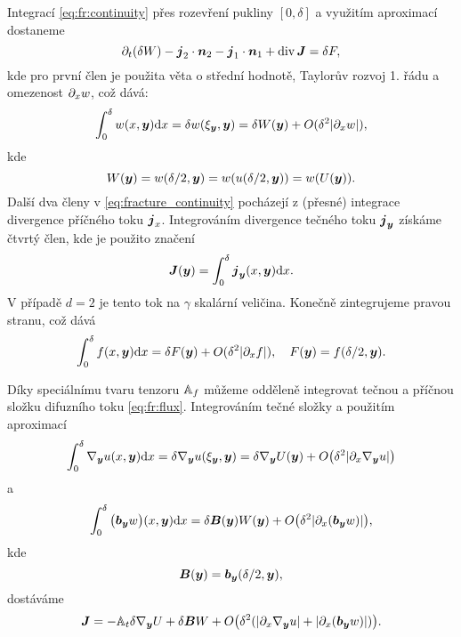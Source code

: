 Integrací \eqref{eq:fr:continuity} přes rozevření pukliny $[0,\delta]$ a využitím aproximací dostaneme
\begin{equation}
    \label{eq:fracture_continuity}
   \prtl_t (\delta W) - \vc j_2 \cdot \vc n_2 - \vc j_1 \cdot \vc n_1 + \div \vc J = \delta F,
\end{equation}
kde pro první člen je použita věta o střední hodnotě, Taylorův rozvoj 1. řádu 
a omezenost $\partial_x w$, což dává:
\[
    \int_0^\delta w(x,\mathbf{\boldsymbol{y}}) \mathrm{d} x=\delta w(\xi_{\mathbf{\boldsymbol{y}}}, \mathbf{\boldsymbol{y}}) = \delta W(\mathbf{\boldsymbol{y}}) + O(\delta^2\lvert\partial_x w\rvert),
\]
kde
\[
    W(\mathbf{\boldsymbol{y}})=w(\delta / 2,\mathbf{\boldsymbol{y}})=w(u(\delta/2,\mathbf{\boldsymbol{y}}))=w(U(\mathbf{\boldsymbol{y}})).
\]
Další dva členy v \eqref{eq:fracture_continuity} pocházejí z (přesné) integrace divergence příčného toku $\mathbf{\boldsymbol{j}}_x$.
Integrováním divergence tečného toku $\mathbf{\boldsymbol{j}}_{\mathbf{\boldsymbol{y}}}$ získáme čtvrtý člen, kde je použito značení
\[
\mathbf{\boldsymbol{J}}(\mathbf{\boldsymbol{y}}) = \int_0^\delta \mathbf{\boldsymbol{j}}_{\mathbf{\boldsymbol{y}}}(x, \mathbf{\boldsymbol{y}}) \mathrm{d} x.
\]
V případě $d=2$ je tento tok na $\gamma$ skalární veličina. Konečně zintegrujeme pravou stranu, což dává
\[
    \int_0^\delta f(x,\mathbf{\boldsymbol{y}}) \mathrm{d} x = \delta F(\mathbf{\boldsymbol{y}}) + O(\delta^2\lvert\partial_x f\rvert),\quad F(\mathbf{\boldsymbol{y}})=f(\delta/2,\mathbf{\boldsymbol{y}}). 
\]


Díky speciálnímu tvaru tenzoru ${\mathbb{A}}_f$ můžeme odděleně integrovat tečnou a příčnou složku difuzního toku \eqref{eq:fr:flux}. Integrováním tečné složky a použitím aproximací
\[
    \int_0^\delta  \nabla_{\mathbf{\boldsymbol{y}}} u(x, \mathbf{\boldsymbol{y}}) \mathrm{d} x = \delta \nabla_{\mathbf{\boldsymbol{y}}} u (\xi_{\mathbf{\boldsymbol{y}}}, \mathbf{\boldsymbol{y}}) 
    = \delta \nabla_{\mathbf{\boldsymbol{y}}} U( \mathbf{\boldsymbol{y}}) + O\big( \delta^2 \lvert\partial_x\nabla_{\mathbf{\boldsymbol{y}}} u\rvert \big) 
\]
a
\[
 \int_0^\delta \big(\mathbf{\boldsymbol{b}}_{\mathbf{\boldsymbol{y}}} w\big)(x, \mathbf{\boldsymbol{y}}) \mathrm{d} x 
  = \delta \mathbf{\boldsymbol{B}}(\mathbf{\boldsymbol{y}}) W(\mathbf{\boldsymbol{y}}) + O\big(\delta^2 \lvert\partial_x(\mathbf{\boldsymbol{b}}_{\mathbf{\boldsymbol{y}}} w)\rvert \big),
\]
kde
\[
  \mathbf{\boldsymbol{B}}(\mathbf{\boldsymbol{y}}) = \mathbf{\boldsymbol{b}}_{\mathbf{\boldsymbol{y}}}(\delta/2, \mathbf{\boldsymbol{y}}),
\]
dostáváme
\begin{equation}
    \label{eq:fracture_darcy}
   \vc J = -\tn A_t \delta \grad_{\vc y} U + \delta \vc B W + O\big(\delta^2(\abs{\prtl_x\grad_{\vc y} u}+\abs{\prtl_x(\vc b_{\vc y} w)})\big).
\end{equation}


